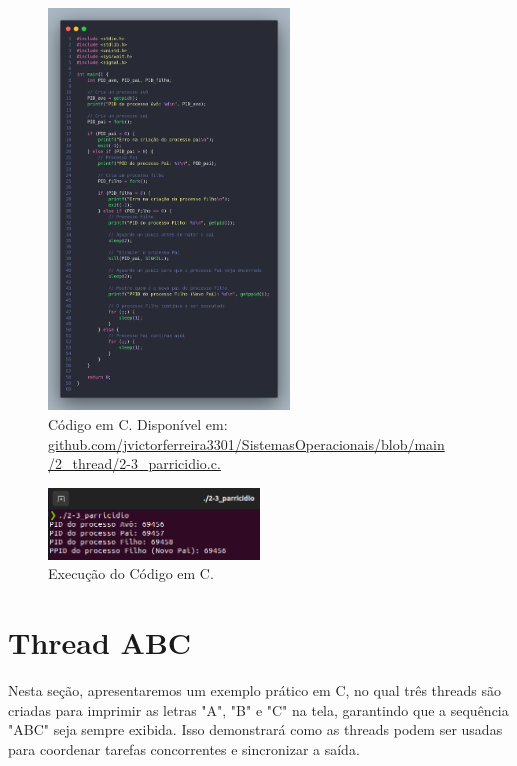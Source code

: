 \documentclass[
	12pt,				%
	openright,			%
	oneside,			%
	a4paper,			%
	chapter=TITLE,		%
	english,			%
	french,				%
	spanish,			%
	brazil				%
	]{abntex2}
\theoremstyle{definition}
\begin{document}
\begin{figure}[H]
    \centering
    \includegraphics[width=0.57\textwidth]{imagens/processos_3.png}
    \caption{Código em C. Disponível em: \href{https://github.com/jvictorferreira3301/Sistemas_Operacionais/blob/main/2_thread/2-3_parricidio.c}{github.com/jvictorferreira3301/SistemasOperacionais/blob/main
    /2\_thread/2-3\_parricidio.c.}} 
    \label{fig:proc3}
\end{figure}

\begin{figure}[H]
    \centering
    \includegraphics[width=0.5\textwidth]{imagens/run_processos_3.png}
    \caption{Execução do Código em C.}
    \label{fig:run3}
\end{figure}

\section{Thread ABC}

Nesta seção, apresentaremos um exemplo prático em C, no qual três threads são 
criadas para imprimir as letras "A", "B" e "C" na tela, garantindo que 
a sequência "ABC" seja sempre exibida. Isso demonstrará como as threads 
podem ser usadas para coordenar tarefas concorrentes e sincronizar a saída.
\end{document}
